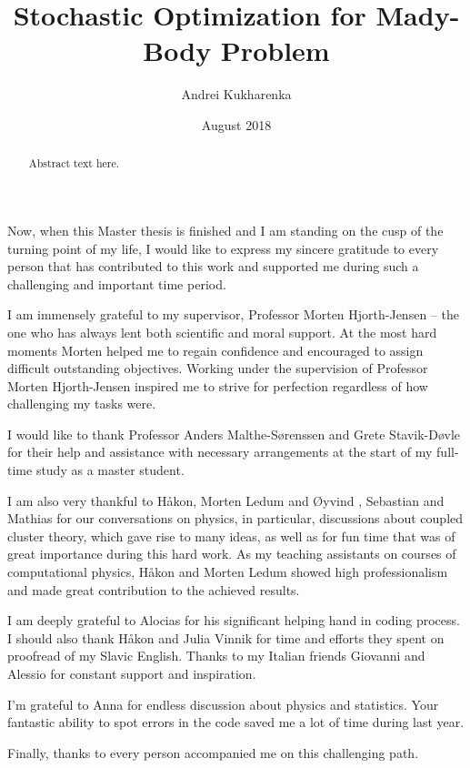 \documentclass[twoside,english]{uiofysmaster}
\author{Andrei Kukharenka}
\title{Stochastic Optimization for Mady-Body Problem}
\date{August 2018}
\begin{document}
	
	\maketitle
	
	\begin{abstract}
		Abstract text here.
	\end{abstract}
	
	
	\begin{acknowledgements}
		Now, when this Master thesis is finished and I am
		standing on the cusp of the turning point of my life,
		I would like to express my sincere gratitude to every
		person that has contributed to this work and supported
		me during such a challenging and important time period.
		
		I am immensely grateful to my supervisor, Professor Morten Hjorth-Jensen -- the one who has always lent both scientific and moral support. At the most hard moments Morten helped me to regain confidence and encouraged to assign difficult outstanding objectives. Working under the supervision of Professor Morten Hjorth-Jensen inspired me to strive for perfection regardless of how challenging my tasks were.
		
		I would like to thank Professor Anders Malthe-S\o renssen and Grete Stavik-D\o vle for their help and assistance with necessary arrangements at the start of my full-time study as a master student.
		
		I am also very thankful to H\aa kon, Morten Ledum and \O yvind , Sebastian and Mathias for our conversations on physics, in particular, discussions about coupled cluster theory, which gave rise to many ideas, as well as for fun time that was of great importance during this hard work. As my teaching assistants on courses of computational physics, H\aa kon and Morten Ledum showed high professionalism and made great contribution to the achieved results.
		
		I am deeply grateful to Alocias for his significant helping hand in coding process. I should also thank H\aa kon and Julia Vinnik for time and efforts they spent on proofread of my Slavic English. Thanks to my Italian friends Giovanni and Alessio for constant support and inspiration.
		
		I'm grateful to Anna for endless discussion about physics and statistics. Your fantastic ability to spot errors in the code saved me a lot of time during last year.
		
		Finally, thanks to every person accompanied me on this challenging path.
	\end{acknowledgements}
	
\end{document}
